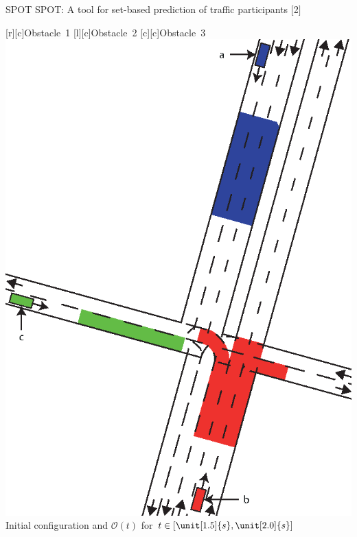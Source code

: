 


\begin{frame}{SPOT}
SPOT: A tool for set-based prediction of traffic participants $[$2$]$%
\vspace{1em}

\begin{center}
	{\footnotesize
	[c]{Obstacle~1}	
	[c]{Obstacle~2}
	[c]{Obstacle~3}
	\includegraphics[height=0.5\textheight]{./figures/Scenario_Intersection_Occ_1,5-2,0s_final.eps}
	} \\
	\vspace{1em}
	Initial configuration and $\mathcal{O}(t)$ for $t \in [\unit[1.5]{s}, \unit[2.0]{s}]$
\end{center}

\end{frame}

